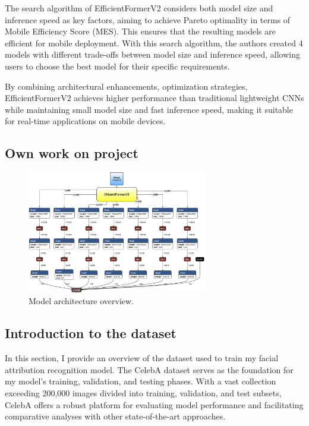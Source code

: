 \documentclass[a4paper,oneside]{article}
\begin{document}
The search algorithm of EfficientFormerV2 considers both model size and inference speed as key factors, aiming to achieve Pareto optimality in terms of Mobile Efficiency Score (MES).
This ensures that the resulting models are efficient for mobile deployment.
With this search algorithm, the authors created 4 models with different trade-offs between model size and inference speed, allowing users to choose the best model for their specific requirements.

By combining architectural enhancements, optimization strategies, EfficientFormerV2 achieves higher performance than traditional lightweight CNNs while maintaining small model size and fast inference speed, making it suitable for real-time applications on mobile devices.

\newpage
\begin{center}
  \section{Own work on project}
  \label{sec:work}
\end{center}

\begin{figure}[h]
  \includegraphics[width=0.7\textwidth]{model.png}
  \centering
  \caption{Model architecture overview.}
  \centering
  \label{fig:model}
\end{figure}

\subsection{Introduction to the dataset}
\label{sec:subsection_dataset_intro}

In this section, I provide an overview of the dataset used to train my facial attribution recognition model.
The CelebA dataset serves as the foundation for my model's training, validation, and testing phases.
With a vast collection exceeding 200,000 images divided into training, validation, and test subsets, CelebA offers a robust platform for evaluating model performance and facilitating comparative analyses with other state-of-the-art approaches.
\end{document}
